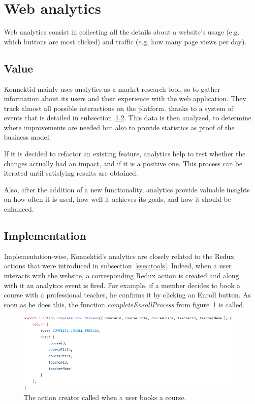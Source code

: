 \section{Web analytics}
\label{sec:analytics}

Web analytics consist in collecting all the details about a website's usage (e.g. which buttons are most clicked) and traffic (e.g. how many page views per day).

\subsection{Value}
\label{ssec:value}

Konnektid mainly uses analytics as a market research tool, so to gather information about its users and their experience with the web application. They track almost all possible interactions on the platform, thanks to a system of events that is detailed in {\sc subsection}~\ref{ssec:analyticsImp}. This data is then analyzed, to determine where improvements are needed but also to provide statistics as proof of the business model. 

If it is decided to refactor an existing feature, analytics help to test whether the changes actually had an impact, and if it is a positive one. This process can be iterated until satisfying results are obtained. 

Also, after the addition of a new functionality, analytics provide valuable insights on how often it is used, how well it achieves its goals, and how it should be enhanced.

\subsection{Implementation}
\label{ssec:analyticsImp}

Implementation-wise, Konnektid's analytics are closely related to the Redux actions that were introduced in {\sc subsection}~\ref{ssec:tools}. Indeed, when a user interacts with the website, a corresponding Redux action is created and along with it an analytics event is fired. For example, if a member decides to book a course with a professional teacher, he confirms it by clicking an \guillemotleft{} Enroll \guillemotright{} button. As soon as he does this, the function \textit{completeEnrollProcess} from {\sc figure}~\ref{fig:enroll} is called.

\begin{figure}[H]
    \centering
    \includegraphics[scale=0.8]{figure/enroll.png}
    \caption{The action creator called when a user books a course.}
    \label{fig:enroll}
\end{figure}

